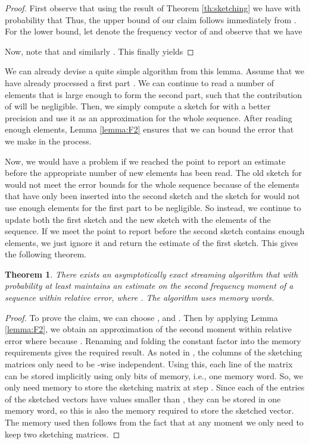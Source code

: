 \documentclass[a4paper,11pt,oneside,english,onecolumn]{article}
\newtheorem{theorem}{Theorem}
\theoremstyle{definition}
\begin{document}
\begin{proof}
First observe that using the result of Theorem \ref{th:sketching} we have with probability  that  Thus, the upper bound of our claim follows immediately from . For the lower bound, let  denote the frequency vector of  and observe that we have

Now, note that  and similarly . This finally yields 

\end{proof}

We can already devise a quite simple algorithm from this lemma. Assume that we have already processed a first part . We can continue to read a number of elements that is large enough to form the second part, such that the contribution of  will be negligible. Then, we simply compute a sketch for  with a better precision and use it as an approximation for the whole sequence. After reading enough elements, Lemma \ref{lemma:F2} ensures that we can bound the error that we make in the process.

Now, we would have a problem if we reached the point to report an estimate before the appropriate number of new elements has been read. The old sketch for  would not meet the error bounds for the whole sequence because of the elements that have only been inserted into the second sketch and the sketch for  would not use enough elements for the first part to be negligible. So instead, we continue to update both the first sketch and the new sketch with the elements of the sequence. If we meet the point to report before the second sketch contains enough elements, we just ignore it and return the estimate of the first sketch. This gives the following theorem.

\begin{theorem}
\label{th:F2}
There exists an asymptotically exact streaming algorithm that with probability at least  maintains an estimate on the second frequency moment of a sequence within  relative error, where . The algorithm uses  memory words.
\end{theorem}

\begin{proof}
To prove the claim, we can choose , and . Then by applying Lemma \ref{lemma:F2}, we obtain an approximation of the second moment within  relative error where  because . Renaming  and folding the constant factor into the memory requirements gives the required result. 
As noted in \cite{ApproxFreqMom}, the columns of the sketching matrices only need to be -wise independent. Using this, each line of the matrix can be stored implicitly using only  bits of memory, i.e., one memory word. So, we only need  memory to store the sketching matrix at step . Since each of the entries of the sketched vectors have values smaller than , they can be stored in one memory word, so this is also the memory required to store the sketched vector. The memory used then follows from the fact that at any moment we only need to keep two sketching matrices.
\end{proof}
\end{document}
